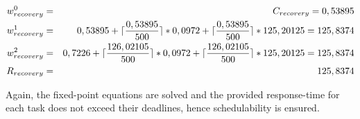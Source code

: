 \begin{eqnarray}
    w_{recovery}^0 &=& C_{recovery} = 0,53895 \nonumber \\ 
    w_{recovery}^1 &=& 0,53895 + \lceil\frac{0,53895}{500}\rceil*0,0972 + \lceil\frac{0,53895}{500}\rceil*125,20125 = 125,8374 \nonumber \\ 
    w_{recovery}^2 &=& 0,7226 + \lceil\frac{126,02105}{500}\rceil*0,0972 + \lceil\frac{126,02105}{500}\rceil*125,20125 = 125,8374 \nonumber \\
    R_{recovery} &=& 125,8374
\end{eqnarray}

Again, the fixed-point equations are solved and the provided response-time for each task does not exceed their deadlines, hence schedulability is ensured.


